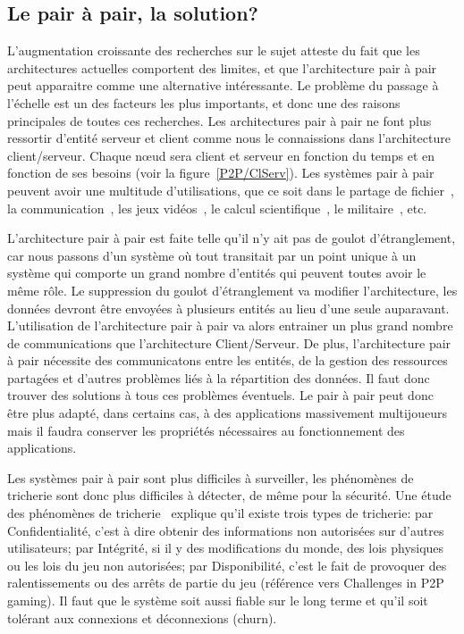 	\subsection{Le pair à pair, la solution?}
	\par L'augmentation croissante des recherches sur le sujet atteste du fait que les architectures actuelles comportent des limites, et que l'architecture pair à pair peut apparaitre comme une alternative intéressante. Le problème du passage à l'échelle est un des facteurs les plus importants, et donc une des raisons principales de toutes ces recherches. Les architectures pair à pair ne font plus ressortir d'entité serveur et client comme nous le connaissions dans l'architecture client/serveur. Chaque nœud sera client et serveur en fonction du temps et en fonction de ses besoins (voir la figure~\ref{P2P/ClServ}). Les systèmes pair à pair peuvent avoir une multitude d'utilisations, que ce soit dans le partage de fichier~\cite{gnutella,napster,kazaa}, la communication~\cite{skype}, les jeux vidéos~\cite{starwars}, le calcul scientifique~\cite{Pastry,xtremweb,chord}, le militaire~\cite{jxta}, etc. \\
	\par L'architecture pair à pair est faite telle qu'il n'y ait pas de goulot d'étranglement, car nous passons d'un système où tout transitait par un point unique à un système qui comporte un grand nombre d'entités qui peuvent toutes avoir le même rôle. Le suppression du goulot d'étranglement va modifier l'architecture, les données devront être envoyées à plusieurs entités au lieu d'une seule auparavant. L'utilisation de l'architecture pair à pair va alors entrainer un plus grand nombre de communications que l'architecture Client/Serveur. De plus, l'architecture pair à pair nécessite des communicatons entre les entités, de la gestion des ressources partagées et d'autres problèmes liés à la répartition des données. Il faut donc trouver des solutions à tous ces problèmes éventuels. Le pair à pair peut donc être plus adapté, dans certains cas, à des applications massivement multijoueurs mais il faudra conserver les propriétés nécessaires au fonctionnement des applications. \\
	\par Les systèmes pair à pair sont plus difficiles à surveiller, les phénomènes de tricherie sont donc plus difficiles à détecter, de même pour la sécurité. Une étude des phénomènes de tricherie~\cite{1198269} explique qu'il existe trois types de tricherie: par Confidentialité, c'est à dire obtenir des informations non autorisées sur d'autres utilisateurs; par Intégrité, si il y des modifications du monde, des lois physiques ou les lois du jeu non autorisées; par Disponibilité, c'est le fait de provoquer des ralentissements ou des arrêts de partie du jeu (référence vers Challenges in P2P gaming). Il faut que le système soit aussi fiable sur le long terme et qu'il soit tolérant aux connexions et déconnexions (churn).\\
